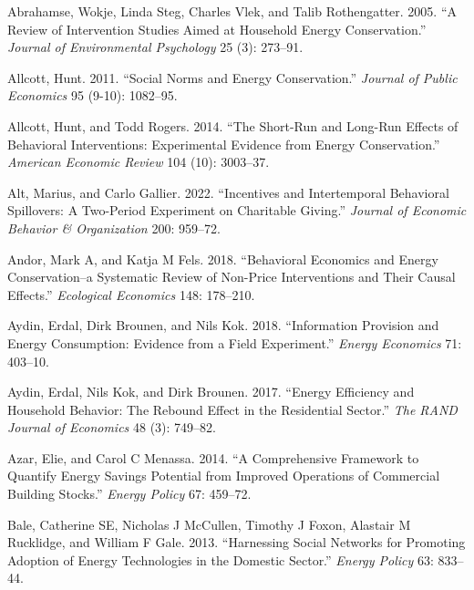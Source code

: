 \documentclass[
  11pt,
]{article}
\newlength{\cslhangindent}
\newlength{\cslentryspacingunit} %
\newenvironment{CSLReferences}[2] %
 {%
  \setlength{\parindent}{0pt}
  \ifodd #1
  \let\oldpar\par
  \def\par{\hangindent=\cslhangindent\oldpar}
  \fi
  \setlength{\parskip}{#2\cslentryspacingunit}
 }%
 {}
\begin{document}
\hypertarget{refs}{}
\begin{CSLReferences}{1}{0}
\leavevmode{}%
Abrahamse, Wokje, Linda Steg, Charles Vlek, and Talib Rothengatter.
2005. {``A Review of Intervention Studies Aimed at Household Energy
Conservation.''} \emph{Journal of Environmental Psychology} 25 (3):
273--91.

\leavevmode{}%
Allcott, Hunt. 2011. {``Social Norms and Energy Conservation.''}
\emph{Journal of Public Economics} 95 (9-10): 1082--95.

\leavevmode{}%
Allcott, Hunt, and Todd Rogers. 2014. {``The Short-Run and Long-Run
Effects of Behavioral Interventions: Experimental Evidence from Energy
Conservation.''} \emph{American Economic Review} 104 (10): 3003--37.

\leavevmode{}%
Alt, Marius, and Carlo Gallier. 2022. {``Incentives and Intertemporal
Behavioral Spillovers: A Two-Period Experiment on Charitable Giving.''}
\emph{Journal of Economic Behavior \& Organization} 200: 959--72.

\leavevmode{}%
Andor, Mark A, and Katja M Fels. 2018. {``Behavioral Economics and
Energy Conservation--a Systematic Review of Non-Price Interventions and
Their Causal Effects.''} \emph{Ecological Economics} 148: 178--210.

\leavevmode{}%
Aydin, Erdal, Dirk Brounen, and Nils Kok. 2018. {``Information Provision
and Energy Consumption: Evidence from a Field Experiment.''}
\emph{Energy Economics} 71: 403--10.

\leavevmode{}%
Aydin, Erdal, Nils Kok, and Dirk Brounen. 2017. {``Energy Efficiency and
Household Behavior: The Rebound Effect in the Residential Sector.''}
\emph{The RAND Journal of Economics} 48 (3): 749--82.

\leavevmode{}%
Azar, Elie, and Carol C Menassa. 2014. {``A Comprehensive Framework to
Quantify Energy Savings Potential from Improved Operations of Commercial
Building Stocks.''} \emph{Energy Policy} 67: 459--72.

\leavevmode{}%
Bale, Catherine SE, Nicholas J McCullen, Timothy J Foxon, Alastair M
Rucklidge, and William F Gale. 2013. {``Harnessing Social Networks for
Promoting Adoption of Energy Technologies in the Domestic Sector.''}
\emph{Energy Policy} 63: 833--44.


\end{CSLReferences}
\end{document}
